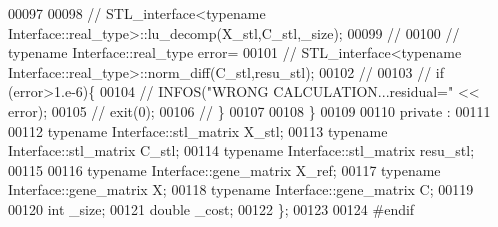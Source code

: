 \begin{DoxyCode}
00097 
00098 \textcolor{comment}{//     STL\_interface<typename Interface::real\_type>::lu\_decomp(X\_stl,C\_stl,\_size);}
00099 \textcolor{comment}{//}
00100 \textcolor{comment}{//     typename Interface::real\_type error=}
00101 \textcolor{comment}{//       STL\_interface<typename Interface::real\_type>::norm\_diff(C\_stl,resu\_stl);}
00102 \textcolor{comment}{//}
00103 \textcolor{comment}{//     if (error>1.e-6)\{}
00104 \textcolor{comment}{//       INFOS("WRONG CALCULATION...residual=" << error);}
00105 \textcolor{comment}{//       exit(0);}
00106 \textcolor{comment}{//     \}}
00107 
00108   \}
00109 
00110 private :
00111 
00112   \textcolor{keyword}{typename} Interface::stl\_matrix X\_stl;
00113   \textcolor{keyword}{typename} Interface::stl\_matrix C\_stl;
00114   \textcolor{keyword}{typename} Interface::stl\_matrix resu\_stl;
00115 
00116   \textcolor{keyword}{typename} Interface::gene\_matrix X\_ref;
00117   \textcolor{keyword}{typename} Interface::gene\_matrix X;
00118   \textcolor{keyword}{typename} Interface::gene\_matrix C;
00119 
00120   \textcolor{keywordtype}{int} \_size;
00121   \textcolor{keywordtype}{double} \_cost;
00122 \};
00123 
00124 \textcolor{preprocessor}{#endif}
\end{DoxyCode}
